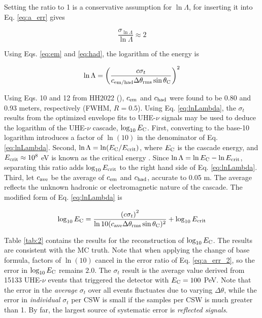 \documentclass[amsmath,amssymb,aps,prd,10pt,twocolumn,showkeys]{revtex4}
\begin{document}
Setting the ratio to 1 is a conservative assumption for $\ln\Lambda$, for inserting it into Eq. \ref{eq:a_err} gives

\begin{equation}
\frac{\sigma_{\ln\Lambda}}{\ln\Lambda} \approx 2 \label{eq:a_err_2}
\end{equation}

Using Eqs. \ref{eq:em} and \ref{eq:had}, the logarithm of the energy is

\begin{equation}
\ln\Lambda = \left( \frac{c\sigma_t}{c_{\rm em/had} \Delta\theta_{\rm rms}\sin\theta_{\rm C}} \right)^2 \label{eq:lnLambda}
\end{equation}

Using Eqs. 10 and 12 from HH2022 (\cite{PhysRevD.105.123019}), $c_{\rm em}$ and $c_{\rm had}$ were found to be 0.80 and 0.93 meters, respectively (FWHM, $R=0.5$).  Using Eq. \ref{eq:lnLambda}, the $\sigma_t$ results from the optimized envelope fits to UHE-$\nu$ signals may be used to deduce the logarithm of the UHE-$\nu$ cascade, $\log_{10} E_{\rm C}$.  First, converting to the base-10 logarithm introduces a factor of $\ln(10)$ in the denominator of Eq. \ref{eq:lnLambda}.  Second, $\ln\Lambda = \ln(E_{\rm C}/E_{\rm crit})$, where $E_{\rm C}$ is the cascade energy, and $E_{\rm crit}\approx 10^8$ eV is known as the critical energy \cite{PhysRevD.105.123019}.  Since $\ln\Lambda = \ln E_{\rm C} - \ln E_{\rm crit}$, separating this ratio adds $\log_{10} E_{\rm crit}$ to the right hand side of Eq. \ref{eq:lnLambda}.  Third, let $c_{\rm ave}$ be the average of $c_{\rm em}$ and $c_{\rm had}$, accurate to 0.05 m.  The average reflects the unknown hadronic or electromagnetic nature of the cascade.  The modified form of Eq. \ref{eq:lnLambda} is

\begin{equation}
\log_{10} E_{\rm C} = \frac{\left( c\sigma_t \right)^2}{\ln 10(c_{\rm ave} \Delta\theta_{\rm rms}\sin\theta_{\rm C})^2} + \log_{10} E_{\rm crit} \label{eq:lnLambda_2}
\end{equation}

Table \ref{tab:2} contains the results for the reconstruction of $\log_{10}E_{\rm C}$.  The results are consistent with the MC truth.  Note that when applying the change of base formula, factors of $\ln(10)$ cancel in the error ratio of Eq. \ref{eq:a_err_2}, so the error in $\log_{10} E_{\rm C}$ remains $2.0$.  The $\sigma_t$ result is the average value derived from 15133 UHE-$\nu$ events that triggered the detector with $E_{\rm C} = 100$ PeV.  Note that the error in the \textit{average} $\sigma_t$ over all events fluctuates due to varying $\Delta\theta$, while the error in \textit{individual} $\sigma_t$ per CSW is small if the samples per CSW is much greater than 1.  By far, the largest source of systematic error is \textit{reflected signals}.
\end{document}
